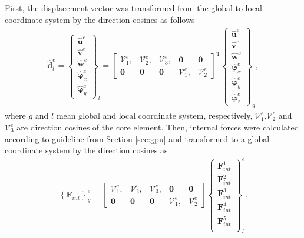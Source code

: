 First, the displacement vector was transformed from the global to local coordinate system by the direction cosines as follows
\begin{eqnarray}
	\widehat{\textbf{d}}^e_l = \left \{\begin{array}{c}
		\widehat{\textbf{u}}^e \\ \widehat{\textbf{v}}^e \\
		\widehat{\textbf{w}}^e \\ \widehat{\boldsymbol{\varphi}}_x^e \\
		\widehat{\boldsymbol{\varphi}}_y^e
	\end{array}\right \}_l = 
	\left [\begin{array}{ccccc}
		\mathcal{V}^e_1, & \mathcal{V}^e_2, & \mathcal{V}^e_3, & \textbf{0} & \textbf{0} \\
		\textbf{0} & \textbf{0} & \textbf{0} & \mathcal{V}^e_1, & \mathcal{V}^e_2
	\end{array}\right ]^{\mathrm{T}}
	\left \{\begin{array}{c}
		\widehat{\textbf{u}}^e \\ \widehat{\textbf{v}}^e \\
		\widehat{\textbf{w}}^e \\ \widehat{\boldsymbol{\varphi}}_x^e \\
		\widehat{\boldsymbol{\varphi}}_y^e\\
		\widehat{\boldsymbol{\varphi}}_z^e
	\end{array}\right \}_g,
	\label{eq:d_local}
\end{eqnarray}
%
where \(g\) and \(l\) mean global and local coordinate system, respectively, \(\mathcal{V}^e_1\),\(\mathcal{V}^e_2\) and \(\mathcal{V}^e_3\) are direction cosines of the core element.
Then, internal forces were calculated according to guideline from Section \ref{sec:gpu} and transformed to a global coordinate system by the direction cosines as
\begin{eqnarray}
	\left\{\textbf{F}_{int}\right\}^e_g =
	\left [\begin{array}{ccccc}
		\mathcal{V}^e_1, & \mathcal{V}^e_2, & \mathcal{V}^e_3, & \textbf{0} & \textbf{0} \\
		\textbf{0} & \textbf{0} & \textbf{0} & \mathcal{V}^e_1, & \mathcal{V}^e_2
	\end{array}\right ]
	\left \{\begin{array}{c}
		\textbf{F}^1_{int} \\
		\textbf{F}^2_{int} \\
		\textbf{F}^3_{int} \\
		\textbf{F}^4_{int} \\
		\textbf{F}^5_{int} \\
	\end{array}\right \}_l^e.
	\label{eq:f_global}
\end{eqnarray}

